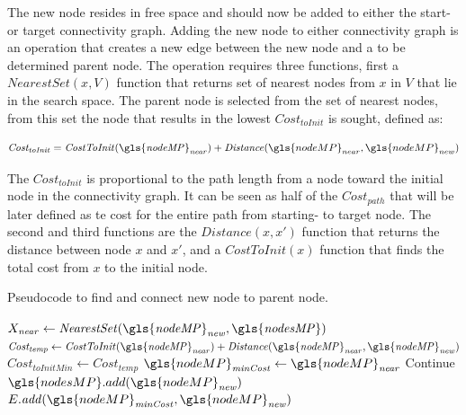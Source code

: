 The new node resides in free space and should now be added to either the start- or target connectivity graph. Adding the new node to either connectivity graph is an operation that creates a new edge between the new node and a to be determined parent node. The operation requires three functions, first a $\mathit{NearestSet}(x, V)$ function that returns set of nearest nodes from $x$ in $V$ that lie in the search space. The parent node is selected from the set of nearest nodes, from this set the node that results in the lowest $\mathit{Cost_{toInit}}$ is sought, defined as:\bs

\[\mathit{Cost_{toInit}} = \mathit{CostToInit(\gls{nodeMP}_{near})} + \mathit{Distance}(\gls{nodeMP}_{near}, \gls{nodeMP}_{new})\]

The $\mathit{Cost_{toInit}}$ is proportional to the path length from a node toward the initial node in the connectivity graph. It can be seen as half of the $\mathit{Cost_{path}}$ that will be later defined as te cost for the entire path from starting- to target node. The second and third functions are the $\mathit{Distance}(x, x')$ function that returns the distance between node $x$ and $x'$, and a $\mathit{CostToInit}(x)$ function that finds the total cost from $x$ to the initial node.\bs

\begin{algorithm}[H]
\caption{Pseudocode to find and connect new node to parent node.}%
\label{pseudocode:proposed_rrt_star_two}
\begin{algorithmic}[1]
\hspace{-0.9cm}\colorbox{my_yellow}{\parbox{\linewidth}{%
    \State $X_\mathit{near} \leftarrow \mathit{NearestSet(\gls{nodeMP}_{new}, \gls{nodesMP})}$
    \State $\mathit{Cost_{temp}} \leftarrow \mathit{CostToInit(\gls{nodeMP}_{near}) + Distance(\gls{nodeMP}_{near}, \gls{nodeMP}_{new})}$
    \State $\mathit{Cost_{toInitMin}} \leftarrow \mathit{Cost_{temp}}$
    \State $\gls{nodeMP}_\mathit{minCost} \leftarrow \gls{nodeMP}_\mathit{near}$
        \EndIf
    \EndFor
        \State Continue
    \Else
    \State $\gls{nodesMP}.add(\gls{nodeMP}_\mathit{new})$
    \State $E.\mathit{add}(\gls{nodeMP}_\mathit{minCost}, \gls{nodeMP}_\mathit{new})$
    \EndIf
}}
\end{algorithmic}
\end{algorithm}

